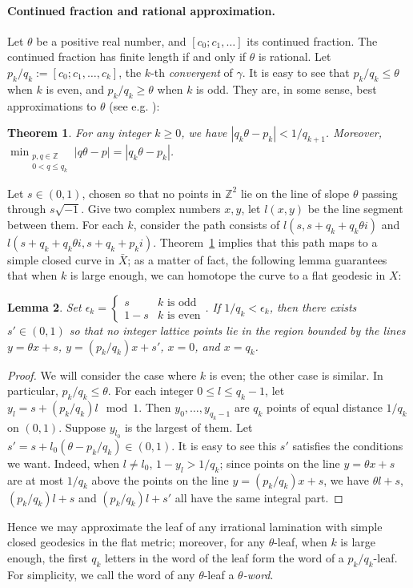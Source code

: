 \documentclass[11pt]{article} %
\theoremstyle{plain}
\newtheorem{thm}{Theorem}[section]
\newtheorem{lm}[thm]{Lemma}
\theoremstyle{definition}
\numberwithin{equation}{section}
\begin{document}
\paragraph{Continued fraction and rational approximation.}
Let $\theta$ be a positive real number, and $[c_0;c_1,\ldots]$ its continued fraction. The continued fraction has finite length if and only if $\theta$ is rational. Let $p_k/q_k:=[c_0;c_1,\ldots,c_k]$, the $k$-th \emph{convergent} of $\gamma$. It is easy to see that $p_k/q_k\le\theta$ when $k$ is even, and $p_k/q_k\ge\theta$ when $k$ is odd. They are, in some sense, best approximations to $\theta$ (see e.g. \cite[\S II.6]{continued_fraction}):
\begin{thm}\label{thm:rational_approx}
For any integer $k\ge0$, we have $|q_k\theta-p_k|<1/q_{k+1}$. Moreover, $\min_{\substack{p,q\in\mathbb{Z}\\0<q\le q_k}}|q\theta-p|=|q_k\theta-p_k|$.
\end{thm}
Let $s\in(0,1)$, chosen so that no points in $\mathbb{Z}^2$ lie on the line of slope $\theta$ passing through $s\sqrt{-1}$. Give two complex numbers $x,y$, let $l(x,y)$ be the line segment between them. For each $k$, consider the path consists of $l(s,s+q_k+q_k\theta i)$ and $l(s+q_k+q_k\theta i,s+q_k+p_ki)$. Theorem~\ref{thm:rational_approx} implies that this path maps to a simple closed curve in $\bar X$; as a matter of fact, the following lemma guarantees that when $k$ is large enough, we can homotope the curve to a flat geodesic in $X$:
\begin{lm} \label{lm:homotop}
Set $\epsilon_k=\begin{cases}s&k\text{ is odd}\\1-s&k\text{ is even}\end{cases}$. If $1/q_k<\epsilon_k$, then there exists $s'\in(0,1)$ so that no integer lattice points lie in the region bounded by the lines $y=\theta x+s$, $y=(p_k/q_k)x+s'$, $x=0$, and $x=q_k$.
\end{lm}
\begin{proof}
We will consider the case where $k$ is even; the other case is similar. In particular, $p_k/q_k\le\theta$. For each integer $0\le l\le q_k-1$, let $y_l=s+(p_k/q_k)l\mod 1$. Then $y_0,\ldots,y_{q_k-1}$ are $q_k$ points of equal distance $1/q_k$ on $(0,1)$. Suppose $y_{l_0}$ is the largest of them. Let $s'=s+l_0(\theta-p_k/q_k)\in(0,1)$. It is easy to see this $s'$ satisfies the conditions we want. Indeed, when $l\neq l_0$, $1-y_l>1/q_k$; since points on the line $y=\theta x+s$ are at most $1/q_k$ above the points on the line $y=(p_k/q_k)x+s$, we have $\theta l+s$, $(p_k/q_k)l+s$ and $(p_k/q_k)l+s'$ all have the same integral part.
\end{proof}
Hence we may approximate the leaf of any irrational lamination with simple closed geodesics in the flat metric; moreover, for any $\theta$-leaf, when $k$ is large enough, the first $q_k$ letters in the word of the leaf form the word of a $p_k/q_k$-leaf. For simplicity, we call the word of any $\theta$-leaf a \emph{$\theta$-word}.
\end{document}
